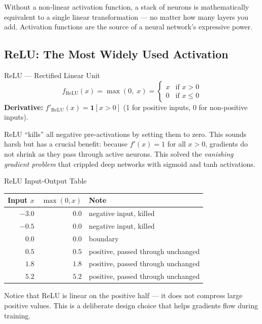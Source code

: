 Without a non-linear activation function, a stack of neurons is mathematically equivalent to a single linear transformation --- no matter how many layers you add. Activation functions are the source of a neural network's expressive power.

\subsection{ReLU: The Most Widely Used Activation}

\begin{mathbox}{ReLU --- Rectified Linear Unit}
\begin{equation}
    f_{\text{ReLU}}(x) = \max(0,\; x) =
    \begin{cases}
        x & \text{if } x > 0 \\
        0 & \text{if } x \le 0
    \end{cases}
\end{equation}
\textbf{Derivative:} $f'_{\text{ReLU}}(x) = \mathbf{1}[x > 0]$ (1 for positive inputs, 0 for non-positive inputs).
\end{mathbox}

ReLU ``kills'' all negative pre-activations by setting them to zero. This sounds harsh but has a crucial benefit: because $f'(x) = 1$ for all $x > 0$, gradients do not shrink as they pass through active neurons. This solved the \emph{vanishing gradient problem} that crippled deep networks with sigmoid and tanh activations.

\begin{examplebox}{ReLU Input-Output Table}
\begin{center}
\renewcommand{\arraystretch}{1.3}
\begin{tabular}{rrl}
\toprule
Input $x$ & $\max(0, x)$ & Note \\
\midrule
$-3.0$ & $0.0$ & negative input, killed \\
$-0.5$ & $0.0$ & negative input, killed \\
$0.0$  & $0.0$ & boundary \\
$0.5$  & $0.5$ & positive, passed through unchanged \\
$1.8$  & $1.8$ & positive, passed through unchanged \\
$5.2$  & $5.2$ & positive, passed through unchanged \\
\bottomrule
\end{tabular}
\end{center}
Notice that ReLU is linear on the positive half --- it does not compress large positive values. This is a deliberate design choice that helps gradients flow during training.
\end{examplebox}

